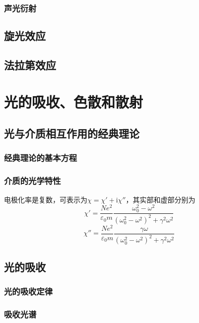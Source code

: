 \documentclass[cn,10pt,chinesefont=founder,math=mtpro2,cite=super,toc=onecol,twoside,openany]{elegantbook}
\begin{document}
\subsection{声光衍射}

\section{旋光效应}

\section{法拉第效应}

\chapter{光的吸收、色散和散射}

\section{光与介质相互作用的经典理论}

\subsection{经典理论的基本方程}

\subsection{介质的光学特性}

电极化率是复数，可表示为$\chi=\chi'+\mathrm{i}\chi''$，其实部和虚部分别为
\begin{equation}
\chi'=\frac{Ne^2}{\varepsilon_0m}\frac{\omega^2_0-\omega^2}{(\omega^2_0-\omega^2)^2+\gamma^2\omega^2}
\end{equation}
\begin{equation}
\chi''=\frac{Ne^2}{\varepsilon_0m}\frac{\gamma\omega}{(\omega^2_0-\omega^2)^2+\gamma^2\omega^2}
\end{equation}

\section{光的吸收}

\subsection{光的吸收定律}

\subsection{吸收光谱}
\end{document}
